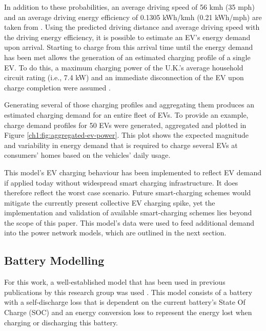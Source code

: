 

 
In addition to these probabilities, an average driving speed of 56 kmh (35 mph) and an average driving energy efficiency of 0.1305 kWh/kmh (0.21 kWh/mph) are taken from \cite{UKGovernmentDigitalService2013}. Using the predicted driving distance and average driving speed with the driving energy efficiency, it is possible to estimate an EV's energy demand upon arrival. Starting to charge from this arrival time until the energy demand has been met allows the generation of an estimated charging profile of a single EV. To do this, a maximum charging power of the U.K.'s average household circuit rating (i.e., 7.4 kW) and an immediate disconnection of the EV upon charge completion were assumed \cite{EVHomeCharging}.

Generating several of those charging profiles and aggregating them produces an estimated charging demand for an entire fleet of EVs. To provide an example, charge demand profiles for 50 EVs were generated, aggregated and plotted in Figure \ref{ch1:fig:aggregated-ev-power}. This plot shows the expected magnitude and variability in energy demand that is required to charge several EVs at consumers' homes based on the vehicles' daily usage.

This model's EV charging behaviour has been implemented to reflect EV demand if applied today without widespread smart charging infrastructure. It does therefore reflect the worst case scenario. Future smart-charging schemes would mitigate the currently present collective EV charging spike, yet the implementation and validation of available smart-charging schemes lies beyond the scope of this paper. This model's data were used to feed additional demand into the power network models, which are outlined in the next section.



\subsection{Battery Modelling}

For this work, a well-established model that has been used in previous publications by this research group was used \cite{Rowe2013, Rowe2014, Rowe2014a}. This model consists of a battery with a self-discharge loss that is dependent on the current battery's State Of Charge (SOC) and an energy conversion loss to represent the energy lost when charging or discharging this battery. 

